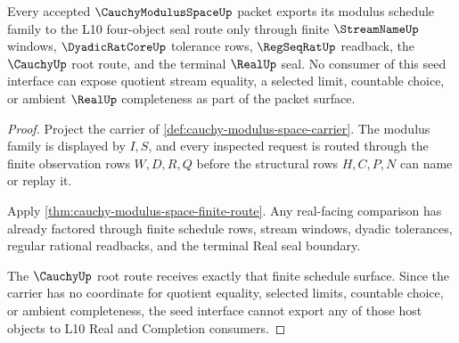\begin{theorem}
\label{thm:cauchy-modulus-space-seed-interface}
Every accepted $\CauchyModulusSpaceUp$ packet exports its modulus schedule
family to the L10 four-object seal route only through finite $\StreamNameUp$
windows, $\DyadicRatCoreUp$ tolerance rows, $\RegSeqRatUp$ readback, the
$\CauchyUp$ root route, and the terminal $\RealUp$ seal. No consumer of this
seed interface can expose quotient stream equality, a selected limit, countable
choice, or ambient $\RealUp$ completeness as part of the packet surface.
\end{theorem}
\begin{proof}
Project the carrier of \autoref{def:cauchy-modulus-space-carrier}. The modulus
family is displayed by $I,S$, and every inspected request is routed through the
finite observation rows $W,D,R,Q$ before the structural rows $H,C,P,N$ can name
or replay it.

Apply \autoref{thm:cauchy-modulus-space-finite-route}. Any real-facing
comparison has already factored through finite schedule rows, stream windows,
dyadic tolerances, regular rational readbacks, and the terminal Real seal
boundary.

The $\CauchyUp$ root route receives exactly that finite schedule surface. Since
the carrier has no coordinate for quotient equality, selected limits, countable
choice, or ambient completeness, the seed interface cannot export any of those
host objects to L10 Real and Completion consumers.
\end{proof}

